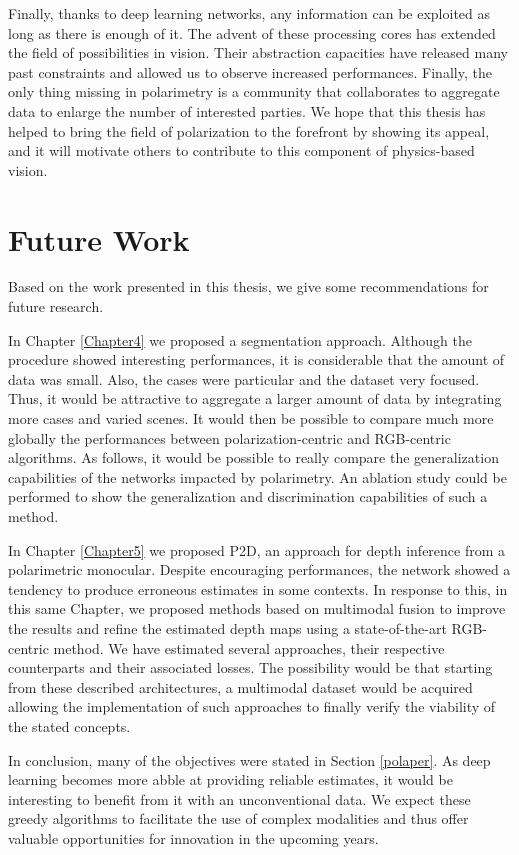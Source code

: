 Finally, thanks to deep learning networks, any information can be exploited as long as there is enough of it. The advent of these processing cores has extended the field of possibilities in vision. Their abstraction capacities have released many past constraints and allowed us to observe increased performances. Finally, the only thing missing in polarimetry is a community that collaborates to aggregate data to enlarge the number of interested parties. We hope that this thesis has helped to bring the field of polarization to the forefront by showing its appeal, and it will motivate others to contribute to this component of physics-based vision.

\section{Future Work}

Based on the work presented in this thesis, we give some recommendations for future research.


In Chapter \ref{Chapter4} we proposed a segmentation approach. Although the procedure showed interesting performances, it is considerable that the amount of data was small. Also, the cases were particular and the dataset very focused. Thus, it would be attractive to aggregate a larger amount of data by integrating more cases and varied scenes. It would then be possible to compare much more globally the performances between polarization-centric and RGB-centric algorithms. As follows, it would be possible to really compare the generalization capabilities of the networks impacted by polarimetry. An ablation study could be performed to show the generalization and discrimination capabilities of such a method.


In Chapter \ref{Chapter5} we proposed P2D, an approach for depth inference from a polarimetric monocular. Despite encouraging performances, the network showed a tendency to produce erroneous estimates in some contexts. In response to this, in this same Chapter, we proposed methods based on multimodal fusion to improve the results and refine the estimated depth maps using a state-of-the-art RGB-centric method. We have estimated several approaches, their respective counterparts and their associated losses. The possibility would be that starting from these described architectures, a multimodal dataset would be acquired allowing the implementation of such approaches to finally verify the viability of the stated concepts.


In conclusion, many of the objectives were stated in Section \ref{polaper}. As deep learning becomes more abble at providing reliable estimates, it would be interesting to benefit from it with an unconventional data. We expect these greedy algorithms to facilitate the use of complex modalities and thus offer valuable opportunities for innovation in the upcoming years.



